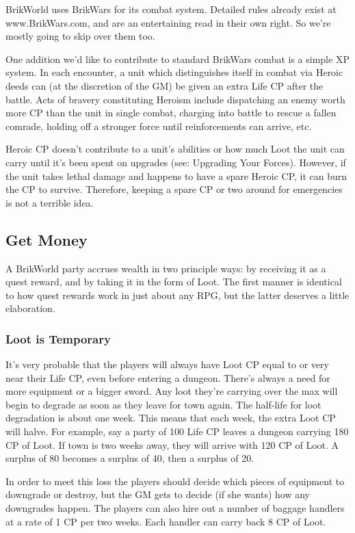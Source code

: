 \documentclass[12pt,a4paper,twocolumn]{article}
\begin{document}
BrikWorld uses BrikWars for its combat system.  Detailed rules already exist at www.BrikWars.com, and are an entertaining read in their own right.  So we're mostly going to skip over them too.  

One addition we'd like to contribute to standard BrikWars combat is a simple XP system.  In each encounter, a unit which distinguishes itself in combat via Heroic deeds can (at the discretion of the GM) be given an extra Life CP after the battle.  Acts of bravery constituting Heroism include dispatching an enemy worth more CP than the unit in single combat, charging into battle to rescue a fallen comrade, holding off a stronger force until reinforcements can arrive, etc.  

Heroic CP doesn't contribute to a unit's abilities or how much Loot the unit can carry until it's been spent on upgrades (see: Upgrading Your Forces).  However, if the unit takes lethal damage and happens to have a spare Heroic CP, it can burn the CP to survive.  Therefore, keeping a spare CP or two around for emergencies is not a terrible idea.

\subsection{Get Money}

A BrikWorld party accrues wealth in two principle ways: by receiving it as a quest reward, and by taking it in the form of Loot.  The first manner is identical to how quest rewards work in just about any RPG, but the latter deserves a little elaboration.

\subsubsection{Loot is Temporary}

It's very probable that the players will always have Loot CP equal to or very near their Life CP, even before entering a dungeon.  There's always a need for more equipment or a bigger sword.  Any loot they're carrying over the max will begin to degrade as soon as they leave for town again.  The half-life for loot degradation is about one week.  This means that each week, the extra Loot CP will halve.  For example, say a party of 100 Life CP leaves a dungeon carrying 180 CP of Loot.  If town is two weeks away, they will arrive with 120 CP of Loot.  A surplus of 80 becomes a surplus of 40, then a surplus of 20.  

In order to meet this loss the players should decide which pieces of equipment to downgrade or destroy, but the GM gets to decide (if she wants) how any downgrades happen.  The players can also hire out a number of baggage handlers at a rate of 1 CP per two weeks.  Each handler can carry back 8 CP of Loot.
\end{document}
